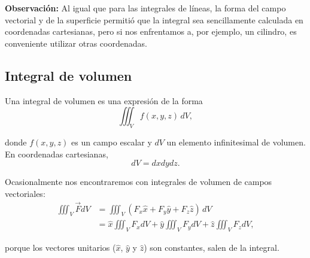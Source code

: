 \textbf{Observación:} Al igual que para las integrales de líneas, la forma del campo vectorial y de la superficie permitió que la integral sea sencillamente calculada en coordenadas cartesianas, pero si nos enfrentamos a, por ejemplo, un cilindro, es conveniente utilizar otras coordenadas.

\subsection{Integral de volumen}

Una integral de volumen es una expresión de la forma
$$\iiint_V f(x,y,z) \,dV,$$

donde $f(x,y,z)$ es un campo escalar y $dV$ un elemento infinitesimal de volumen. En coordenadas cartesianas,
$$dV = dx dy dz.$$

Ocasionalmente nos encontraremos con integrales de volumen de campos vectoriales:
\begin{align*}
  \iiint_V \vec{F} dV &= \iiint_V (F_x \hat{x} + F_y \hat{y} + F_z \hat{z}) \,dV\\
  &=\hat{x} \iiint_V F_x dV +  \hat{y} \iiint_V F_y dV  + \hat{z} \iiint_V F_z dV, 
\end{align*}

porque los vectores unitarios ($\hat{x}$, $\hat{y}$ y $\hat{z}$) son constantes, salen de la integral.

